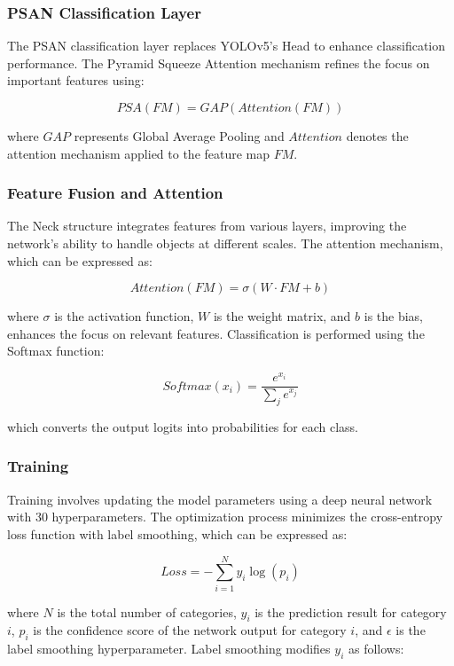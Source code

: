 \documentclass[12pt,a4paper]{article}
\begin{document}
\subsubsection{PSAN Classification Layer}
The PSAN classification layer replaces YOLOv5's Head to enhance classification performance. The Pyramid Squeeze Attention mechanism refines the focus on important features using:

\begin{equation}
PSA(FM) = GAP(Attention(FM))
\end{equation}

where $GAP$ represents Global Average Pooling and $Attention$ denotes the attention mechanism applied to the feature map $FM$.

\subsubsection{Feature Fusion and Attention}
The Neck structure integrates features from various layers, improving the network's ability to handle objects at different scales. The attention mechanism, which can be expressed as:

\begin{equation}
Attention(FM) = \sigma(W \cdot FM + b)
\end{equation}

where $\sigma$ is the activation function, $W$ is the weight matrix, and $b$ is the bias, enhances the focus on relevant features. Classification is performed using the Softmax function:

\begin{equation}
Softmax(x_i) = \frac{e^{x_i}}{\sum_j e^{x_j}}
\end{equation}

which converts the output logits into probabilities for each class.

\subsubsection{Training}
Training involves updating the model parameters using a deep neural network with 30 hyperparameters. The optimization process minimizes the cross-entropy loss function with label smoothing, which can be expressed as:

\begin{equation}
Loss = -\sum_{i=1}^N y_i \log(p_i)
\end{equation}

where $N$ is the total number of categories, $y_i$ is the prediction result for category $i$, $p_i$ is the confidence score of the network output for category $i$, and $\epsilon$ is the label smoothing hyperparameter. Label smoothing modifies $y_i$ as follows:
\end{document}
